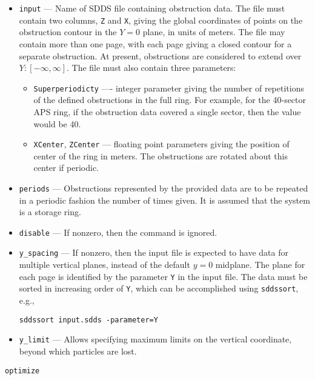 \documentclass[11pt]{article}
\begin{document}
\begin{itemize}

\item \verb|input| --- Name of SDDS file containing obstruction data. The file must contain two columns, \verb|Z| and 
  \verb|X|, giving the global coordinates of points on the obstruction contour in the $Y=0$ plane, in units of meters.
  The file may contain more than one page, with each page giving a closed contour for a separate obstruction.
  At present, obstructions are considered to extend over $Y:[-\infty, \infty]$.
  The file must also contain three parameters: 
  \begin{itemize}
  \item \verb|Superperiodicty| ---- integer parameter giving the number of repetitions of the
    defined obstructions in the full ring. For example, for the 40-sector APS ring, if the obstruction data covered
    a single sector, then the value would be 40.
  \item \verb|XCenter|, \verb|ZCenter| --- floating point parameters giving the position of center of the ring in meters.
    The obstructions are rotated about this center if periodic.
  \end{itemize}
\item \verb|periods| --- Obstructions represented by the provided data are to be repeated in a 
  periodic fashion the number of times given. It is assumed that the system is a storage ring.
\item \verb|disable| --- If nonzero, then the command is ignored.
\item \verb|y_spacing| --- If nonzero, then the input file is expected to have data for multiple vertical planes,
  instead of the default $y=0$ midplane. The plane for each page is identified by the parameter \verb|Y| in the
  input file. The data must be sorted in increasing order of \verb|Y|, which can be accomplished using \verb|sddssort|, e.g.,
\begin{verbatim}
sddssort input.sdds -parameter=Y
\end{verbatim}
\item \verb|y_limit| --- Allows specifying maximum limits on the vertical coordinate, beyond which particles are lost.
\end{itemize}

\newpage
\begin{center}{\Large\verb|optimize|}\end{center}
\end{document}

